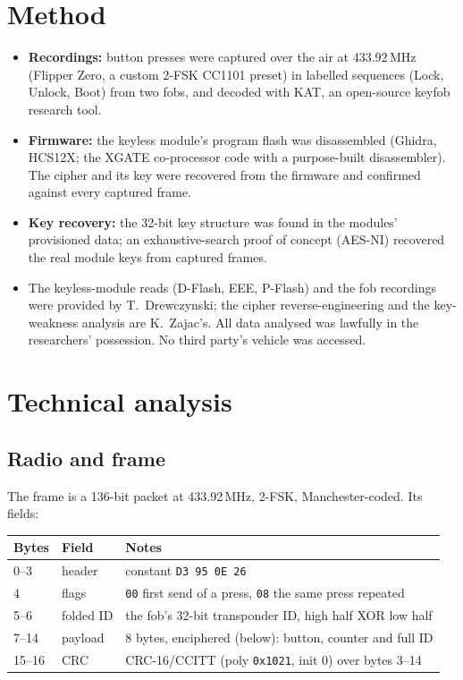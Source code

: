 \documentclass[11pt,a4paper]{article}
\newcommand{\hex}[1]{\texttt{#1}}
\begin{document}
\section{Method}
\begin{itemize}
\item \textbf{Recordings:} button presses were captured over the air at 433.92\,MHz (Flipper Zero, a custom 2-FSK CC1101 preset) in labelled sequences (Lock, Unlock, Boot) from two fobs, and decoded with KAT, an open-source keyfob research tool.
\item \textbf{Firmware:} the keyless module's program flash was disassembled (Ghidra, HCS12X; the XGATE co-processor code with a purpose-built disassembler). The cipher and its key were recovered from the firmware and confirmed against every captured frame.
\item \textbf{Key recovery:} the 32-bit key structure was found in the modules' provisioned data; an exhaustive-search proof of concept (AES-NI) recovered the real module keys from captured frames.
\item The keyless-module reads (D-Flash, EEE, P-Flash) and the fob recordings were provided by T.~Drewczynski; the cipher reverse-engineering and the key-weakness analysis are K.~Zajac's. All data analysed was lawfully in the researchers' possession. No third party's vehicle was accessed.
\end{itemize}

\section{Technical analysis}
\subsection{Radio and frame}
The frame is a 136-bit packet at 433.92\,MHz, 2-FSK, Manchester-coded. Its fields:
\begin{table}[h]
\centering\small
\begin{tabular}{lll}
\toprule
Bytes & Field & Notes \\
\midrule
0--3 & header & constant \hex{D3 95 0E 26} \\
4 & flags & \hex{00} first send of a press, \hex{08} the same press repeated \\
5--6 & folded ID & the fob's 32-bit transponder ID, high half XOR low half \\
7--14 & payload & 8 bytes, enciphered (below): button, counter and full ID \\
15--16 & CRC & CRC-16/CCITT (poly \hex{0x1021}, init 0) over bytes 3--14 \\
\bottomrule
\end{tabular}
\end{table}
\end{document}
